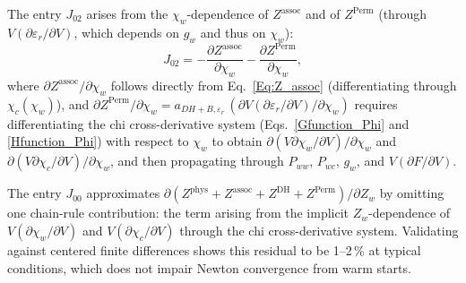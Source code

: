 The entry $J_{02}$ arises from the $\chi_w$-dependence of $Z^{\text{assoc}}$ and of
$Z^{\text{Perm}}$ (through $V(\partial\varepsilon_r/\partial V)$, which depends on
$g_w$ and thus on $\chi_w$):
\begin{equation}
  J_{02} = -\frac{\partial Z^{\text{assoc}}}{\partial\chi_w}
           - \frac{\partial Z^{\text{Perm}}}{\partial\chi_w},
  \label{Eq:J02}
\end{equation}
where $\partial Z^{\text{assoc}}/\partial\chi_w$ follows directly from
Eq.~\eqref{Eq:Z_assoc} (differentiating through $\chi_c(\chi_w)$), and
$\partial Z^{\text{Perm}}/\partial\chi_w = a_{DH+B,\varepsilon_r}\,
(\partial V(\partial\varepsilon_r/\partial V)/\partial\chi_w)$ requires
differentiating the chi cross-derivative system (Eqs.~\eqref{Gfunction_Phi}
and \eqref{Hfunction_Phi}) with respect to $\chi_w$ to obtain
$\partial(V\partial\chi_w/\partial V)/\partial\chi_w$ and
$\partial(V\partial\chi_c/\partial V)/\partial\chi_w$, and then propagating
through $P_{ww}$, $P_{wc}$, $g_w$, and $V(\partial F/\partial V)$.

The entry $J_{00}$ approximates $\partial(Z^{\text{phys}}+Z^{\text{assoc}}+Z^{\text{DH}}
+Z^{\text{Perm}})/\partial Z_w$ by omitting one chain-rule contribution:
the term arising from the implicit $Z_w$-dependence of
$V(\partial\chi_w/\partial V)$ and $V(\partial\chi_c/\partial V)$ through the
chi cross-derivative system.  Validating against centered finite differences
shows this residual to be 1--2\,\% at typical conditions, which does not
impair Newton convergence from warm starts.

